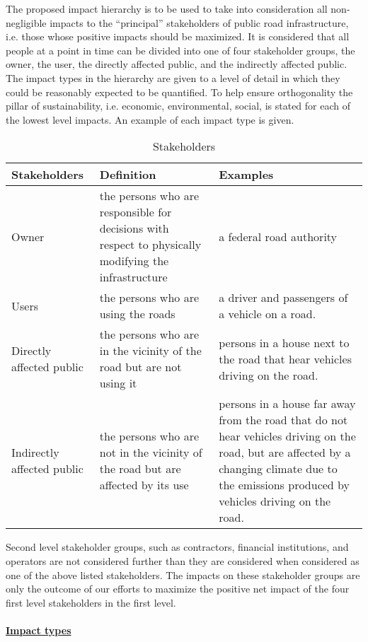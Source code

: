 The proposed impact hierarchy is to be used to take into consideration all non-negligible impacts to the ``principal'' stakeholders of public road infrastructure, i.e. those whose positive impacts should be maximized. It is considered that all people at a point in time can be divided into one of four stakeholder groups, the owner, the user, the directly affected public, and the indirectly affected public. The impact types in the hierarchy are given to a level of detail in which they could be reasonably expected to be quantified. To help ensure orthogonality the pillar of sustainability, i.e. economic, environmental, social, is stated for each of the lowest level impacts. An example of each impact type is given.

\begin{table}[htbp]
\caption{Stakeholders}
\begin{tabular}{|p{90pt}|p{170pt}|p{170pt}|}
\hline
Stakeholders & Definition & Examples \\ \hline
Owner & the persons who are responsible for decisions with respect to physically modifying the infrastructure & a federal road authority  \\ \hline
Users & the persons who are using the roads & a driver and passengers of a vehicle on a road. \\ \hline
Directly affected public & the persons who are in the vicinity of the road but are not using it & persons in a house next to the road that hear vehicles driving on the road. \\ \hline
Indirectly affected public & the persons who are not in the vicinity of the road but are affected by its use & persons in a house far away from the road that do not hear vehicles driving on the road, but are affected by a changing climate due to the emissions produced by vehicles driving on the road. \\ \hline
\end{tabular}
\label{tbl:21}
\end{table}

Second level stakeholder groups, such as contractors, financial institutions, and operators are not considered further than they are considered when considered as one of the above listed stakeholders. The impacts on these stakeholder groups are only the outcome of our efforts to maximize the positive net impact of the four first level stakeholders in the first level.

\paragraph{\underline{Impact types}}

